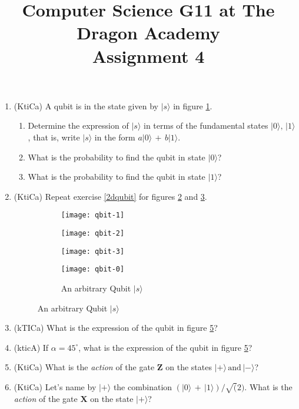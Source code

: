 \documentclass{article}
\title{
Computer Science G11 at The Dragon Academy\\
Assignment 4
}
\author{}
\begin{document}
\maketitle

\begin{enumerate}
\item \label{2dqubit}(KtiCa) A qubit is in the state given by $|s\rangle$ in figure \ref{qbit-1}.
	\begin{enumerate}
	\item Determine the expression of $|s\rangle$ in terms of the fundamental states $|0\rangle,\,|1\rangle$, that is, write $|s\rangle$ in the form 
		$a|0\rangle\,+\,b|1\rangle$.
	\item What is the probability to find the qubit in state $|0\rangle$?
	\item What is the probability to find the qubit in state $|1\rangle$?
	\end{enumerate}
\item (KtiCa) Repeat exercise \ref{2dqubit} for figures \ref{qbit-2} and \ref{qbit-3}. %
\begin{figure}[h]
\centering
	\begin{subfigure}[h]{0.25\textwidth}
	\texttt{[image: qbit-1]}
	\caption{}
	\label{qbit-1}
	\end{subfigure}
	\begin{subfigure}[h]{0.25\textwidth}
	\texttt{[image: qbit-2]}
	\caption{}
	\label{qbit-2}
	\end{subfigure}
	\begin{subfigure}[h]{0.25\textwidth}
	\texttt{[image: qbit-3]}
	\caption{}
	\label{qbit-3}
	\end{subfigure}
	\begin{subfigure}[h]{0.25\textwidth}
	\texttt{[image: qbit-0]}
	\caption{An arbitrary Qubit $|s\rangle$}
	\label{qbit-0}
	\end{subfigure}
\end{figure}
\item (kTICa) What is the expression of the qubit in figure \ref{qbit-0}?
\item (kticA) If $\alpha=45^\circ$, what is the expression of the qubit in figure \ref{qbit-0}?
\item (KtiCa) What is the \textit{action} of the gate $\mathbf{Z}$ on the states $|+\rangle\,\mbox{and}\,|-\rangle$?
\item (KtiCa) Let's name by $|+\rangle$ the combination $(|0\rangle\,+\,|1\rangle)/\sqrt(2)$. What is the \textit{action} of the gate $\mathbf{X}$ on the state $|+\rangle$?

\end{enumerate}
\end{document}
